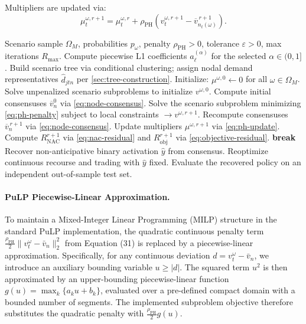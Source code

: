\documentclass[11pt,a4paper]{article}
\begin{document}
Multipliers are updated via:
\begin{equation}
  \mu_t^{\omega,r+1}
  =
  \mu_t^{\omega,r}
  +
  \rho_{\mathrm{PH}}\left(
    v_t^{\omega,r+1}-\overline{v}_{n_t(\omega)}^{\,r+1}
  \right).
  \label{eq:ph-update}
\end{equation}

\begin{algorithm}[htbp]
\caption{Multistage SAA--Progressive Hedging framework.}
\label{alg:ph}
\begin{algorithmic}[1]
\Require Scenario sample \(\Omega_M\), probabilities \(p_\omega\),
penalty \(\rho_{\mathrm{PH}}>0\), tolerance \(\varepsilon>0\), max
iterations \(R_{\max}\).
\State Compute piecewise L1 coefficients
\(a_\ell^{(\alpha)}\) for the selected \(\alpha\in(0,1]\).
\State Build scenario tree via conditional clustering; assign nodal
demand representatives \(\widehat{d}_{jtn}\) per
\cref{sec:tree-construction}.
\State Initialize: \(\mu^{\omega,0}\leftarrow 0\) for all
\(\omega\in\Omega_M\).
\State Solve unpenalized scenario subproblems to initialize
\(v^{\omega,0}\).
\State Compute initial consensuses \(\overline{v}_n^0\) via
\cref{eq:node-consensus}.
    \State Solve the scenario subproblem minimizing
    \cref{eq:ph-penalty} subject to local constraints
    \(\to v^{\omega,r+1}\).
  \EndFor
  \State Recompute consensuses \(\overline{v}_n^{\,r+1}\) via
  \cref{eq:node-consensus}.
  \State Update multipliers \(\mu^{\omega,r+1}\) via
  \cref{eq:ph-update}.
  \State Compute \(R_{\mathrm{NAC}}^{r+1}\) via
  \cref{eq:nac-residual} and \(R_{\mathrm{obj}}^{r+1}\) via
  \cref{eq:objective-residual}.
    \State \textbf{break}
  \EndIf
\EndFor
\State Recover non-anticipative binary activation
\(\hat{y}\) from consensus.
\State Reoptimize continuous recourse and trading with
\(\hat{y}\) fixed.
\State Evaluate the recovered policy on an independent
out-of-sample test set.
\end{algorithmic}
\end{algorithm}

\paragraph{PuLP Piecewise-Linear Approximation.}
To maintain a Mixed-Integer Linear Programming (MILP) structure in the standard PuLP implementation, the quadratic continuous penalty term $\frac{\rho_{\mathrm{PH}}}{2}\|v_t^\omega - \bar v_n\|_2^2$ from Equation (31) is replaced by a piecewise-linear approximation. Specifically, for any continuous deviation $d = v_t^\omega - \bar v_n$, we introduce an auxiliary bounding variable $u \ge |d|$. The squared term $u^2$ is then approximated by an upper-bounding piecewise-linear function $g(u) = \max_{k} \{ a_k u + b_k \}$, evaluated over a pre-defined compact domain with a bounded number of segments. The implemented subproblem objective therefore substitutes the quadratic penalty with $\frac{\rho_{\mathrm{PH}}}{2}g(u)$.
\end{document}
